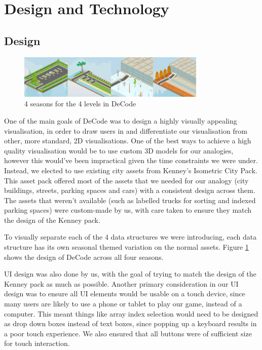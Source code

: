 \documentclass[11pt]{article}
\begin{document}
\section{Design and Technology}
\subsection{Design}
\begin{figure}
  \centering
  \includegraphics[width=0.8\textwidth]{images/seasons.png}
\caption{4 seasons for the 4 levels in DeCode}
\label{fig:seasons}
\end{figure}
One of the main goals of DeCode was to design a highly visually appealing visualisation, in order to draw users in and differentiate our visualisation from other, more standard, 2D visualisations. One of the best ways to achieve a high quality visualisation would be to use custom 3D models for our analogies, however this would've been impractical given the time constraints we were under. Instead, we elected to use existing city assets from Kenney's Isometric City Pack\cite{KenneyAssets}. This asset pack offered most of the assets that we needed for our analogy (city buildings, streets, parking spaces and cars) with a consistent design across them. The assets that weren't available (such as labelled trucks for sorting and indexed parking spaces) were custom-made by us, with care taken to ensure they match the design of the Kenney pack.\par
To visually separate each of the 4 data structures we were introducing, each data structure has its own seasonal themed variation on the normal assets. Figure \ref{fig:seasons} shows the design of DeCode across all four seasons.\par
UI design was also done by us, with the goal of trying to match the design of the Kenney pack as much as possible. Another primary consideration in our UI design was to ensure all UI elements would be usable on a touch device, since many users are likely to use a phone or tablet to play our game, instead of a computer. This meant things like array index selection would need to be designed as drop down boxes instead of text boxes, since popping up a keyboard results in a poor touch experience. We also ensured that all buttons were of sufficient size for touch interaction.
\end{document}
